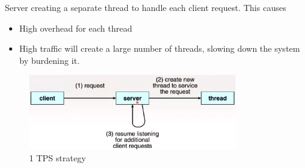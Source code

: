 \documentclass[a4paper]{article}
\theoremstyle{plain}
\theoremstyle{definition}
\newtheorem{defn}{Definition}[section]
\theoremstyle{remark}
\begin{document}
\begin{tcolorbox}[colback=black!3!white,colframe=black!60!white,title=\begin{defn}One thread-per-request strategy \label{One thread-per-request strategy}\end{defn}]
Server creating a separate thread to handle each client request. This causes
\begin{itemize}
	\item High overhead for each thread
	\item High traffic will create a large number of threads, slowing down the system by burdening it.
\end{itemize}
\begin{figure}[H]
	\centering
	\includegraphics[width=0.8\textwidth]{thirtytwo.png}
	\caption{1 TPS strategy}
	\label{fig:thirtytwo-png}
\end{figure}
\end{tcolorbox}
\end{document}
